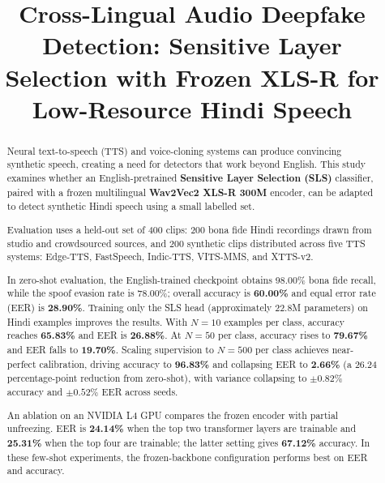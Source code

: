 \documentclass[conference]{IEEEtran}
\begin{document}
\title{Cross-Lingual Audio Deepfake Detection: Sensitive Layer Selection with Frozen XLS-R for Low-Resource Hindi Speech}

\author{
}

\maketitle

\begin{abstract}
Neural text-to-speech (TTS) and voice-cloning systems can produce convincing synthetic speech, creating a need for detectors that work beyond English. This study examines whether an English-pretrained \textbf{Sensitive Layer Selection (SLS)} classifier, paired with a frozen multilingual \textbf{Wav2Vec2 XLS-R 300M} encoder, can be adapted to detect synthetic Hindi speech using a small labelled set.

Evaluation uses a held-out set of 400 clips: 200 bona fide Hindi recordings drawn from studio and crowdsourced sources, and 200 synthetic clips distributed across five TTS systems: Edge-TTS, FastSpeech, Indic-TTS, VITS-MMS, and XTTS-v2.

In zero-shot evaluation, the English-trained checkpoint obtains 98.00\% bona fide recall, while the spoof evasion rate is 78.00\%; overall accuracy is \textbf{60.00\%} and equal error rate (EER) is \textbf{28.90\%}. Training only the SLS head (approximately 22.8M parameters) on Hindi examples improves the results. With $N=10$ examples per class, accuracy reaches \textbf{65.83\%} and EER is \textbf{26.88\%}. At $N=50$ per class, accuracy rises to \textbf{79.67\%} and EER falls to \textbf{19.70\%}. Scaling supervision to $N=500$ per class achieves near-perfect calibration, driving accuracy to \textbf{96.83\%} and collapsing EER to \textbf{2.66\%} (a 26.24 percentage-point reduction from zero-shot), with variance collapsing to $\pm 0.82\%$ accuracy and $\pm 0.52\%$ EER across seeds.

An ablation on an NVIDIA L4 GPU compares the frozen encoder with partial unfreezing. EER is \textbf{24.14\%} when the top two transformer layers are trainable and \textbf{25.31\%} when the top four are trainable; the latter setting gives \textbf{67.12\%} accuracy. In these few-shot experiments, the frozen-backbone configuration performs best on EER and accuracy.
\end{abstract}
\end{document}
